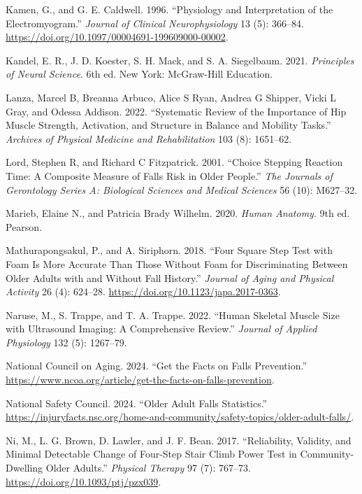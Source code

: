 \documentclass[
  letterpaper,
  DIV=11,
  numbers=noendperiod]{scrartcl}
\newlength{\cslhangindent}
\newenvironment{CSLReferences}[2] %
 {\begin{list}{}{%
  \setlength{\itemindent}{0pt}
  \setlength{\leftmargin}{0pt}
  \setlength{\parsep}{0pt}
  \ifodd #1
   \setlength{\leftmargin}{\cslhangindent}
   \setlength{\itemindent}{-1\cslhangindent}
  \fi
  \setlength{\itemsep}{#2\baselineskip}}}
 {\end{list}}
\begin{document}
\begin{CSLReferences}{1}{0}
Kamen, G., and G. E. Caldwell. 1996. {``Physiology and Interpretation of
the Electromyogram.''} \emph{Journal of Clinical Neurophysiology} 13
(5): 366--84. \url{https://doi.org/10.1097/00004691-199609000-00002}.

Kandel, E. R., J. D. Koester, S. H. Mack, and S. A. Siegelbaum. 2021.
\emph{Principles of Neural Science}. 6th ed. New York: McGraw-Hill
Education.

Lanza, Marcel B, Breanna Arbuco, Alice S Ryan, Andrea G Shipper, Vicki L
Gray, and Odessa Addison. 2022. {``Systematic Review of the Importance
of Hip Muscle Strength, Activation, and Structure in Balance and
Mobility Tasks.''} \emph{Archives of Physical Medicine and
Rehabilitation} 103 (8): 1651--62.

Lord, Stephen R, and Richard C Fitzpatrick. 2001. {``Choice Stepping
Reaction Time: A Composite Measure of Falls Risk in Older People.''}
\emph{The Journals of Gerontology Series A: Biological Sciences and
Medical Sciences} 56 (10): M627--32.

Marieb, Elaine N., and Patricia Brady Wilhelm. 2020. \emph{Human
Anatomy}. 9th ed. Pearson.

Mathurapongsakul, P., and A. Siriphorn. 2018. {``Four Square Step Test
with Foam Is More Accurate Than Those Without Foam for Discriminating
Between Older Adults with and Without Fall History.''} \emph{Journal of
Aging and Physical Activity} 26 (4): 624--28.
\url{https://doi.org/10.1123/japa.2017-0363}.

Naruse, M., S. Trappe, and T. A. Trappe. 2022. {``Human Skeletal Muscle
Size with Ultrasound Imaging: A Comprehensive Review.''} \emph{Journal
of Applied Physiology} 132 (5): 1267--79.

National Council on Aging. 2024. {``Get the Facts on Falls
Prevention.''}
\url{https://www.ncoa.org/article/get-the-facts-on-falls-prevention}.

National Safety Council. 2024. {``Older Adult Falls Statistics.''}
\url{https://injuryfacts.nsc.org/home-and-community/safety-topics/older-adult-falls/}.

Ni, M., L. G. Brown, D. Lawler, and J. F. Bean. 2017. {``Reliability,
Validity, and Minimal Detectable Change of Four-Step Stair Climb Power
Test in Community-Dwelling Older Adults.''} \emph{Physical Therapy} 97
(7): 767--73. \url{https://doi.org/10.1093/ptj/pzx039}.


\end{CSLReferences}
\end{document}
